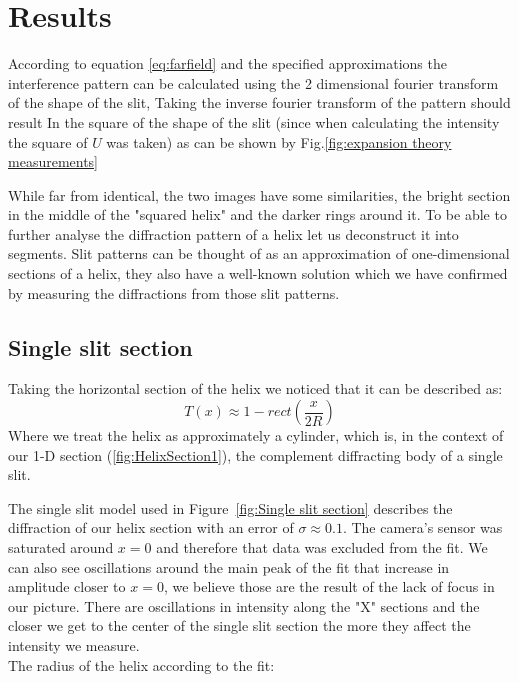 \section{Results}\label{sec:results}
According to equation \eqref{eq:farfield} and the specified approximations the interference pattern can be calculated using
the 2 dimensional fourier transform of the shape of the slit, Taking the inverse fourier transform of the pattern should result
In the square of the shape of the slit (since when calculating the intensity the square of $U$ was taken)
as can be shown by Fig.\ref{fig:expansion theory measurements}


While far from identical, the two images have some similarities, the bright section in the middle of the "squared helix" and the darker rings around it.
To be able to further analyse the diffraction pattern of a helix let us deconstruct it into segments.
Slit patterns can be thought of as an approximation of one-dimensional sections of a helix, they also have a well-known solution which we have confirmed by measuring the diffractions from those slit patterns.



\subsection{Single slit section}
Taking the horizontal section of the helix we noticed that it can be described as:
\[T(x)\approx 1-rect\left(\frac{x}{2R}\right)\]
Where we treat the helix as approximately a cylinder, which is, in the context of our 1-D section (\ref{fig:HelixSection1}), the complement diffracting body of a single slit.

The single slit model used in Figure~\ref{fig:Single slit section} describes the diffraction of our helix section with an error of $\sigma\approx0.1$.
The camera's sensor was saturated around $x=0$ and therefore that data was excluded from the fit.
We can also see oscillations around the main peak of the fit that increase in amplitude closer to $x=0$, we believe those are the result of the lack of focus in our picture.
There are oscillations in intensity along the "X" sections and the closer we get to the center of the single slit section the more they affect the intensity we measure.
\\
The radius of the helix according to the fit:
\[\]


